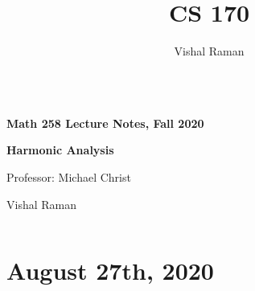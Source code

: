 \documentclass[11pt]{scrartcl}
\begin{document}
\title{CS 170}
\author{Vishal Raman}
\thispagestyle{empty}
$ $
\vfill
\begin{center}

\centerline{\huge \textbf{Math 258 Lecture Notes, Fall 2020}}
\centerline{\Large \textbf{Harmonic Analysis} } 
\centerline{Professor: Michael Christ}
\centerline{Vishal Raman}
\end{center}
\vfill
$ $
\newpage
\thispagestyle{empty}
\tableofcontents
\newpage
\section{August 27th, 2020}
\end{document}
